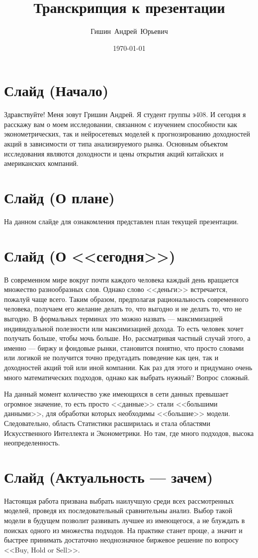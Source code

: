 \documentclass[a4paper, 12pt]{article}
\title{Транскрипция к презентации}
\author{Гишин~Андрей~Юрьевич}
\date{\today}
\begin{document}
	\maketitle
	\section{Слайд (Начало)}
		Здравствуйте! Меня зовут Гришин Андрей. Я студент группы э408. И сегодня я расскажу вам о моем исследовании, связанном с изучением способности как эконометрических, так и нейросетевых моделей к прогнозированию доходностей акций в зависимости от типа анализируемого рынка. Основным объектом исследования являются доходности и цены открытия акций китайских и американских компаний.
	\section{Слайд (О плане)}
		На данном слайде для ознакомления представлен план текущей презентации.
	\section{Слайд (О <<сегодня>>)}
		 В современном мире вокруг почти каждого человека каждый день вращается множество разнообразных слов. Однако слово <<деньги>> встречается, пожалуй чаще всего. Таким образом, предполагая рациональность современного человека, получаем его желание делать то, что выгодно и не делать то, что не выгодно. В формальных терминах это можно назвать --- максимизацией индивидуальной полезности или максимизацией дохода. То есть человек хочет получать больше, чтобы мочь больше. Но, рассматривая частный случай этого, а именно --- биржу и фондовые рынки, становится понятно, что просто словами или логикой не получится точно предугадать поведение как цен, так и доходностей акций той или иной компании. Как раз для этого и придумано очень много математических подходов, однако как выбрать нужный? Вопрос сложный.
		 
		 На данный момент количество уже имеющихся в сети данных превышает огромное значение, то есть просто <<данные>> стали <<большими данными>>, для обработки которых необходимы <<большие>> модели. Следовательно, область Статистики расширилась и стала областями Искусственного Интеллекта и Эконометрики. Но там, где много подходов, высока неопределенность. 
	\section{Слайд (Актуальность --- зачем)}
		Настоящая работа призвана выбрать наилучшую среди всех рассмотренных моделей, проведя их последовательный сравнительны анализ. Выбор такой модели в будущем позволит развивать лучшее из имеющегося, а не блуждать в поисках одного из множества подходов. На практике станет проще, а значит и быстрее принимать достаточно неоднозначное биржевое решение по вопросу <<Buy, Hold or Sell>>. 
\end{document}
